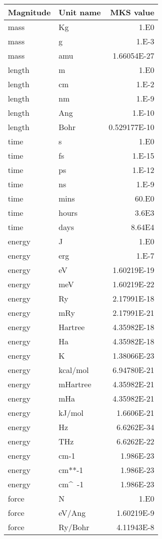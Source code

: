 \begin{center}
\begin{tabular}{llr}
Magnitude & Unit name & MKS value \\
\hline
mass     & Kg         & 1.E0 \\
mass     & g          & 1.E-3 \\
mass     & amu        & 1.66054E-27 \\
length   & m          & 1.E0 \\
length   & cm         & 1.E-2 \\
length   & nm         & 1.E-9 \\
length   & Ang        & 1.E-10 \\
length   & Bohr       & 0.529177E-10 \\
time     & s          & 1.E0 \\
time     & fs         & 1.E-15 \\
time     & ps         & 1.E-12 \\
time     & ns         & 1.E-9 \\
time     & mins       & 60.E0 \\
time     & hours      & 3.6E3 \\
time     & days       & 8.64E4 \\
energy   & J          & 1.E0 \\
energy   & erg        & 1.E-7 \\
energy   & eV         & 1.60219E-19 \\
energy   & meV        & 1.60219E-22 \\
energy   & Ry         & 2.17991E-18 \\
energy   & mRy        & 2.17991E-21 \\
energy   & Hartree    & 4.35982E-18 \\
energy   & Ha         & 4.35982E-18 \\
energy   & K          & 1.38066E-23 \\
energy   & kcal/mol   & 6.94780E-21 \\
energy   & mHartree   & 4.35982E-21 \\
energy   & mHa        & 4.35982E-21 \\
energy   & kJ/mol     & 1.6606E-21 \\
energy   & Hz         & 6.6262E-34 \\
energy   & THz        & 6.6262E-22 \\
energy   & cm-1       & 1.986E-23 \\
energy   & cm**-1     & 1.986E-23 \\
energy   & cm\^~-1      & 1.986E-23 \\
force    & N          & 1.E0 \\
force    & eV/Ang     & 1.60219E-9 \\
force    & Ry/Bohr    & 4.11943E-8 \\
\hline
\end{tabular}


\end{center}
